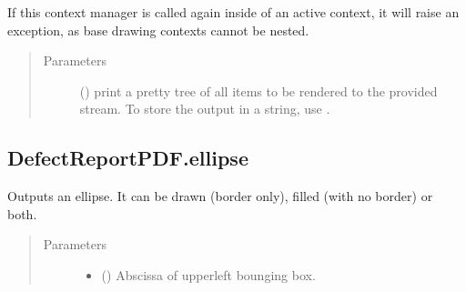 \documentclass[letterpaper,10pt,english]{sphinxmanual}
\begin{document}
\begin{fulllineitems}
\begin{fulllineitems}
\sphinxAtStartPar
If this context manager is called again inside of an active context, it will
raise an exception, as base drawing contexts cannot be nested.
\begin{quote}\begin{description}
\item[{Parameters}] \leavevmode
\sphinxAtStartPar
{} () \textendash{} print a pretty tree of all items to be rendered
to the provided stream. To store the output in a string, use
.

\end{description}\end{quote}

\end{fulllineitems}



\subsection{DefectReportPDF.ellipse}
\label{\detokenize{generated/quality_assessment.quality_pdf_report.DefectReportPDF.ellipse:defectreportpdf-ellipse}}\label{\detokenize{generated/quality_assessment.quality_pdf_report.DefectReportPDF.ellipse::doc}}

\begin{fulllineitems}
\label{\detokenize{generated/quality_assessment.quality_pdf_report.DefectReportPDF.ellipse:quality_assessment.quality_pdf_report.DefectReportPDF.ellipse}}
\sphinxAtStartPar
Outputs an ellipse.
It can be drawn (border only), filled (with no border) or both.
\begin{quote}\begin{description}
\item[{Parameters}] \leavevmode\begin{itemize}
\item {} 
\sphinxAtStartPar
{} () \textendash{} Abscissa of upper\sphinxhyphen{}left bounging box.


\end{itemize}
\end{description}
\end{quote}
\end{fulllineitems}
\end{fulllineitems}
\end{document}
